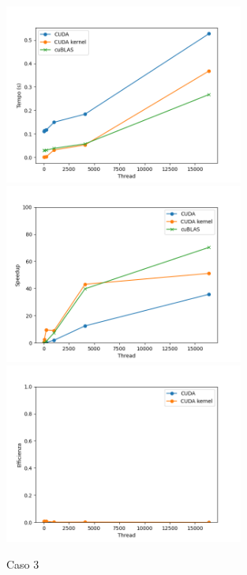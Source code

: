 \begin{figure}[h]
    \centering
    \includegraphics[width=0.7\textwidth]{./imgs/graphs/caso_c.png}
    \includegraphics[width=0.7\textwidth]{./imgs/graphs/caso_c_speedup.png}
    \includegraphics[width=0.7\textwidth]{./imgs/graphs/caso_c_efficiency.png}
    \caption{Caso 3}
\end{figure}

